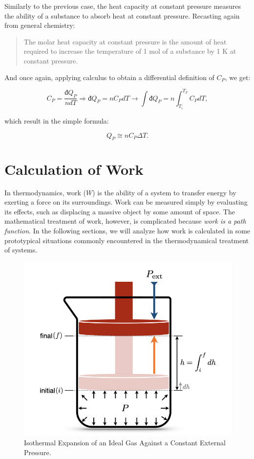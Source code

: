 \documentclass[
  9pt,
]{extbook}
\theoremstyle{definition}
\theoremstyle{definition}
\theoremstyle{definition}
\theoremstyle{definition}
\theoremstyle{remark}
\begin{document}
Similarly to the previous case, the heat capacity at constant pressure measures the ability of a substance to absorb heat at constant pressure. Recasting again from general chemistry:

\begin{quote}
The molar heat capacity at constant pressure is the amount of heat required to increase the temperature of 1 mol of a substance by 1 K at constant pressure.
\end{quote}

And once again, applying calculus to obtain a differential definition of \(C_P\), we get:

\begin{equation}
  C_P = \frac{đ Q_P}{n dT} \Rightarrow đ Q_P = n C_P dT \rightarrow \int đ Q_P = n \int_{T_i}^{T_F}C_P dT,
  \label{eq:Cpdef}
\end{equation}

which result in the simple formula:

\begin{equation}
  Q_P \cong n C_P \Delta T.
  \label{eq:Cpint}
\end{equation}

\section{Calculation of Work}\label{workint}

In thermodynamics, work (\(W\)) is the ability of a system to transfer energy by exerting a force on its surroundings. Work can be measured simply by evaluating its effects, such as displacing a massive object by some amount of space. The mathematical treatment of work, however, is complicated because \emph{work is a path function}. In the following sections, we will analyze how work is calculated in some prototypical situations commonly encountered in the thermodynamical treatment of systems.

\begin{figure}

{\centering \includegraphics[width=0.5\linewidth]{./img/OEP_Figures.004} 

}

\caption{Isothermal Expansion of an Ideal Gas Against a Constant External Pressure.}\label{fig:Fig2c3}
\end{figure}
\end{document}

